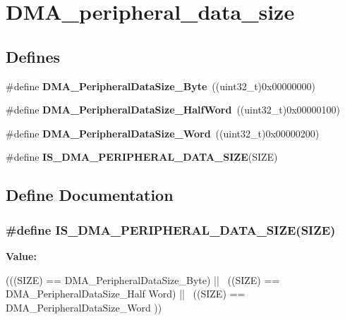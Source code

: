 \hypertarget{group__DMA__peripheral__data__size}{
\section{DMA\_\-peripheral\_\-data\_\-size}
\label{group__DMA__peripheral__data__size}
}
\subsection*{Defines}
\begin{DoxyCompactItemize}
\item 
\hypertarget{group__DMA__peripheral__data__size_ga7577035ae4ff413164000227a8cea346}{
\#define {\bfseries DMA\_\-PeripheralDataSize\_\-Byte}~((uint32\_\-t)0x00000000)}
\label{group__DMA__peripheral__data__size_ga7577035ae4ff413164000227a8cea346}

\item 
\hypertarget{group__DMA__peripheral__data__size_gab1988e5005ee65c261018f62866e4585}{
\#define {\bfseries DMA\_\-PeripheralDataSize\_\-HalfWord}~((uint32\_\-t)0x00000100)}
\label{group__DMA__peripheral__data__size_gab1988e5005ee65c261018f62866e4585}

\item 
\hypertarget{group__DMA__peripheral__data__size_ga516ea7a40945d8325fe73e079b245ea1}{
\#define {\bfseries DMA\_\-PeripheralDataSize\_\-Word}~((uint32\_\-t)0x00000200)}
\label{group__DMA__peripheral__data__size_ga516ea7a40945d8325fe73e079b245ea1}

\item 
\#define {\bfseries IS\_\-DMA\_\-PERIPHERAL\_\-DATA\_\-SIZE}(SIZE)
\end{DoxyCompactItemize}


\subsection{Define Documentation}
\hypertarget{group__DMA__peripheral__data__size_gad7916e0ae55cdf5efdfa68a09a028037}{
\subsubsection[{IS\_\-DMA\_\-PERIPHERAL\_\-DATA\_\-SIZE}]{\setlength{\rightskip}{0pt plus 5cm}\#define IS\_\-DMA\_\-PERIPHERAL\_\-DATA\_\-SIZE(SIZE)}}
\label{group__DMA__peripheral__data__size_gad7916e0ae55cdf5efdfa68a09a028037}
{\bfseries Value:}
\begin{DoxyCode}
(((SIZE) == DMA_PeripheralDataSize_Byte) || \
                                           ((SIZE) == DMA_PeripheralDataSize_Half
      Word) || \
                                           ((SIZE) == DMA_PeripheralDataSize_Word
      ))
\end{DoxyCode}
